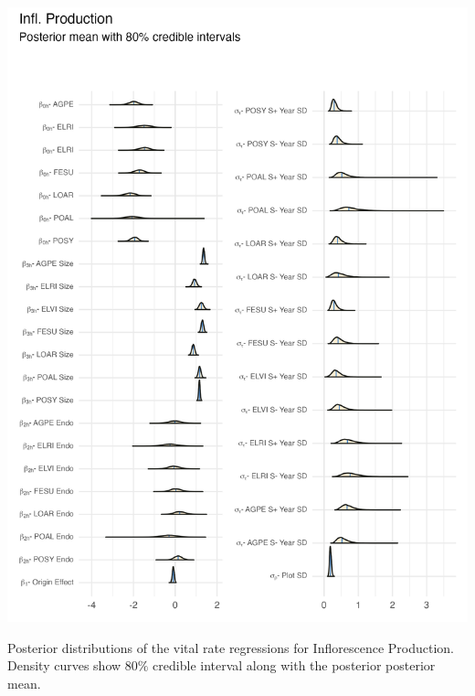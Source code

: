 \documentclass[lineno, sn-basic]{sn-jnl}%
\providecommand{\DIFaddbegin}{} %
\providecommand{\DIFaddend}{} %
\providecommand{\DIFdelbegin}{} %
\providecommand{\DIFdelend}{} %
\providecommand{\DIFaddbeginFL}{} %
\providecommand{\DIFaddendFL}{} %
\providecommand{\DIFdelbeginFL}{} %
\providecommand{\DIFdelendFL}{} %
\newcommand{\DIFscaledelfig}{0.5}
\newlength{\DIFdelgraphicswidth} %
\newlength{\DIFdelgraphicsheight} %
\newcommand{\DIFaddincludegraphics}[2][]{{\color{blue}\fbox{\DIFOincludegraphics[#1]{#2}}}} %
\newcommand{\DIFdelincludegraphics}[2][]{%
\sbox{\DIFdelgraphicsbox}{\DIFOincludegraphics[#1]{#2}}%
\settoboxwidth{\DIFdelgraphicswidth}{\DIFdelgraphicsbox} %
\settoboxtotalheight{\DIFdelgraphicsheight}{\DIFdelgraphicsbox} %
\scalebox{\DIFscaledelfig}{%
\parbox[b]{\DIFdelgraphicswidth}{\usebox{\DIFdelgraphicsbox}\\[-\baselineskip] \rule{\DIFdelgraphicswidth}{0em}}\llap{\resizebox{\DIFdelgraphicswidth}{\DIFdelgraphicsheight}{%
\setlength{\unitlength}{\DIFdelgraphicswidth}%
\begin{picture}(1,1)%
\thicklines\linethickness{2pt} %
{\color[rgb]{1,0,0}\put(0,0){\framebox(1,1){}}}%
{\color[rgb]{1,0,0}\put(0,0){\line( 1,1){1}}}%
{\color[rgb]{1,0,0}\put(0,1){\line(1,-1){1}}}%
\end{picture}%
}\hspace*{3pt}}} %
} %
\DeclareRobustCommand{\DIFaddbegin}{\DIFOaddbegin \let\includegraphics\DIFaddincludegraphics} %
\DeclareRobustCommand{\DIFaddend}{\DIFOaddend \let\includegraphics\DIFOincludegraphics} %
\DeclareRobustCommand{\DIFdelbegin}{\DIFOdelbegin \let\includegraphics\DIFdelincludegraphics} %
\DeclareRobustCommand{\DIFdelend}{\DIFOaddend \let\includegraphics\DIFOincludegraphics} %
\DeclareRobustCommand{\DIFaddbeginFL}{\DIFOaddbeginFL \let\includegraphics\DIFaddincludegraphics} %
\DeclareRobustCommand{\DIFaddendFL}{\DIFOaddendFL \let\includegraphics\DIFOincludegraphics} %
\DeclareRobustCommand{\DIFdelbeginFL}{\DIFOdelbeginFL \let\includegraphics\DIFdelincludegraphics} %
\DeclareRobustCommand{\DIFdelendFL}{\DIFOaddendFL \let\includegraphics\DIFOincludegraphics} %
\begin{document}
\DIFdelbegin %
\DIFdelendFL \DIFaddbeginFL \begin{myfigure}[H]
	\DIFaddendFL \centering
	\includegraphics[width = \linewidth]{fert_posteriors_plot.png}
	\DIFdelbeginFL %
\DIFdelendFL \DIFaddbeginFL \caption[Posterior distributions of the vital rate regressions for Inflorescence Production]{\DIFaddendFL Posterior distributions of the vital rate regressions for Inflorescence Production. Density curves show $80\%$ credible interval along with the posterior posterior mean.}
\DIFdelbeginFL %
\DIFdelend \DIFaddbegin \end{myfigure}
\DIFaddend 
\end{document}

